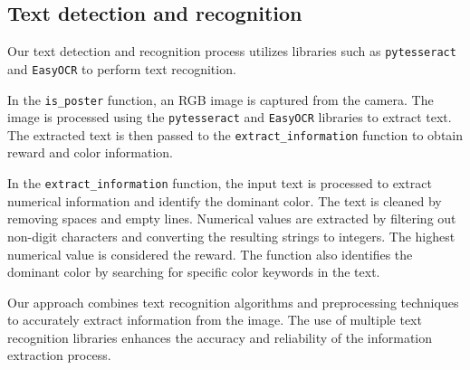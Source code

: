 \documentclass{article}
\begin{document}
\subsection{Text detection and recognition}

Our text detection and recognition process utilizes libraries such as \texttt{pytesseract} and \texttt{EasyOCR} to perform text recognition.

In the \texttt{is\_poster} function, an RGB image is captured from the camera. The image is processed using the \texttt{pytesseract} and \texttt{EasyOCR} libraries to extract text. The extracted text is then passed to the \texttt{extract\_information} function to obtain reward and color information.

In the \texttt{extract\_information} function, the input text is processed to extract numerical information and identify the dominant color. The text is cleaned by removing spaces and empty lines. Numerical values are extracted by filtering out non-digit characters and converting the resulting strings to integers. The highest numerical value is considered the reward. The function also identifies the dominant color by searching for specific color keywords in the text.

Our approach combines text recognition algorithms and preprocessing techniques to accurately extract information from the image. The use of multiple text recognition libraries enhances the accuracy and reliability of the information extraction process.
\end{document}
